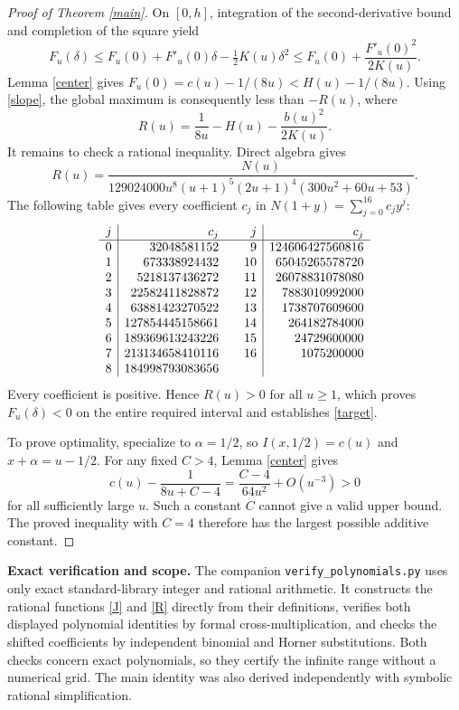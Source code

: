 \documentclass[11pt]{article}
\begin{document}
\begin{proof}[Proof of Theorem \ref{main}]
On \([0,h]\), integration of the second-derivative bound and
completion of the square yield
\[
 F_u(\delta)
 \leq F_u(0)+F'_u(0)\delta-\tfrac12K(u)\delta^2
 \leq F_u(0)+\frac{F'_u(0)^2}{2K(u)}.
\]
Lemma \ref{center} gives \(F_u(0)=c(u)-1/(8u)<H(u)-1/(8u)\).
Using \eqref{slope}, the global maximum is consequently less than
\(-R(u)\), where
\begin{equation}\label{R}
 R(u)=\frac1{8u}-H(u)-\frac{b(u)^2}{2K(u)}.
\end{equation}
It remains to check a rational inequality. Direct algebra gives
\begin{equation}\label{certificate}
 R(u)=
 \frac{N(u)}
 {129024000u^8(u+1)^5(2u+1)^4(300u^2+60u+53)}.
\end{equation}
The following table gives every coefficient \(c_j\) in
\(N(1+y)=\sum_{j=0}^{16}c_jy^j\):
\[
\begin{array}{r|r@{\qquad}r|r}
j&c_j&j&c_j\\ \hline
0&32048581152&9&124606427560816\\
1&673338924432&10&65045265578720\\
2&5218137436272&11&26078831078080\\
3&22582411828872&12&7883010992000\\
4&63881423270522&13&1738707609600\\
5&127854445158661&14&264182784000\\
6&189369613243226&15&24729600000\\
7&213134658410116&16&1075200000\\
8&184998793083656&&
\end{array}
\]
Every coefficient is positive. Hence \(R(u)>0\) for all \(u\geq1\),
which proves \(F_u(\delta)<0\) on the entire required interval and
establishes \eqref{target}.

To prove optimality, specialize to \(\alpha=1/2\), so
\(I(x,1/2)=c(u)\) and \(x+\alpha=u-1/2\).
For any fixed \(C>4\), Lemma \ref{center} gives
\[
 c(u)-\frac1{8u+C-4}
 =\frac{C-4}{64u^2}+O(u^{-3})>0
\]
for all sufficiently large \(u\). Such a constant \(C\) cannot
give a valid upper bound. The proved inequality with \(C=4\)
therefore has the largest possible additive constant.
\end{proof}

\noindent\textbf{Exact verification and scope.}
The companion \texttt{verify\_polynomials.py} uses only exact
standard-library integer and rational arithmetic. It constructs the
rational functions \eqref{J} and \eqref{R} directly from their
definitions, verifies both displayed polynomial identities by formal
cross-multiplication, and checks the shifted coefficients by independent
binomial and Horner substitutions. Both checks concern exact
polynomials, so they certify the infinite range without a numerical grid.
The main identity was also derived independently with symbolic
rational simplification.
\end{document}

